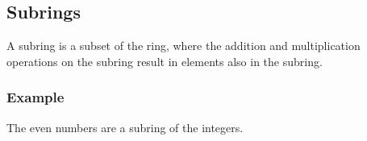 
\subsection{Subrings}

A subring is a subset of the ring, where the addition and multiplication operations on the subring result in elements also in the subring.

\subsubsection{Example}

The even numbers are a subring of the integers.

